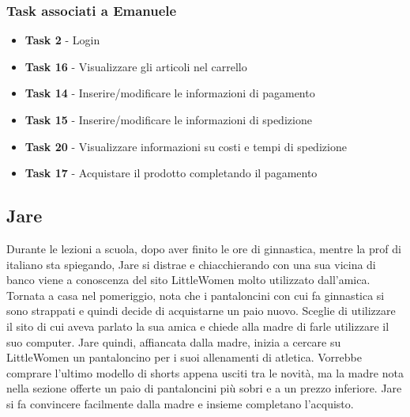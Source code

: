 \documentclass[12pt,a4paper]{report}
\begin{document}
\subsubsection*{Task associati a Emanuele}
\begin{itemize}
\item \textbf{Task 2} - Login
\item \textbf{Task 16} - Visualizzare gli articoli nel carrello
\item \textbf{Task 14} - Inserire/modificare le informazioni di pagamento
\item \textbf{Task 15} - Inserire/modificare le informazioni di spedizione
\item \textbf{Task 20} - Visualizzare informazioni su costi e tempi di spedizione
\item \textbf{Task 17} - Acquistare il prodotto completando il pagamento
\end{itemize}

\subsection*{Jare}
Durante le lezioni a scuola, dopo aver finito le ore di ginnastica, mentre la prof di italiano sta spiegando, Jare si distrae e chiacchierando con una sua vicina di banco viene a conoscenza del sito LittleWomen molto utilizzato dall'amica. Tornata a casa nel pomeriggio, nota che i pantaloncini con cui fa ginnastica si sono strappati e quindi decide di acquistarne un paio nuovo. Sceglie di utilizzare il sito di cui aveva parlato la sua amica e chiede alla madre di farle utilizzare il suo computer. Jare quindi, affiancata dalla madre, inizia a cercare su LittleWomen un pantaloncino per i suoi allenamenti di atletica. Vorrebbe comprare l'ultimo modello di shorts appena usciti tra le novità, ma la madre nota nella sezione offerte un paio di pantaloncini più sobri e a un prezzo inferiore. Jare si fa convincere facilmente dalla madre e insieme completano l'acquisto.
\end{document}
